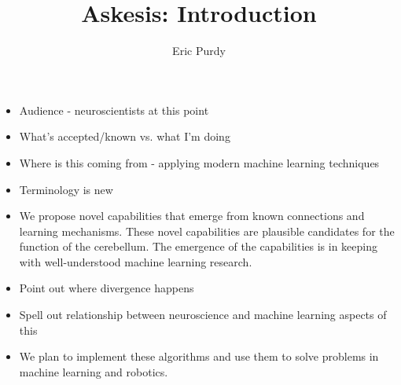 \documentclass{article}
\title{Askesis: Introduction} \author{Eric Purdy}
\theoremstyle{definition}
\begin{document}
\maketitle

\begin{itemize}
\item Audience - neuroscientists at this point
\item What's accepted/known vs. what I'm doing
\item Where is this coming from - applying modern machine learning
  techniques
\item Terminology is new
\item We propose novel capabilities that emerge from known connections
  and learning mechanisms. These novel capabilities are plausible
  candidates for the function of the cerebellum. The emergence of the
  capabilities is in keeping with well-understood machine learning
  research.
\item Point out where divergence happens
\item Spell out relationship between neuroscience and machine learning
  aspects of this
\item We plan to implement these algorithms and use them to solve
  problems in machine learning and robotics.
\end{itemize}
\end{document}
